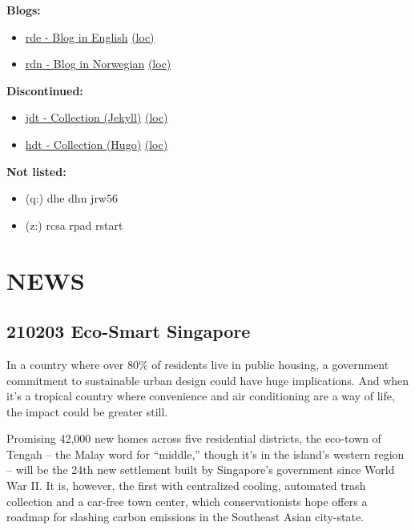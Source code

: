 \documentclass[
]{book}
\providecommand{\tightlist}{%
  \setlength{\itemsep}{0pt}\setlength{\parskip}{0pt}}
\begin{document}
\textbf{Blogs:}

\begin{itemize}
\tightlist
\item
  \href{https://dyrehaugen.github.io/rde}{rde - Blog in English} \href{http://localhost/rde}{(loc)}
\item
  \href{https://dyrehaugen.github.io/rdn}{rdn - Blog in Norwegian} \href{http://localhost/rdn}{(loc)}
\end{itemize}

\textbf{Discontinued:}

\begin{itemize}
\tightlist
\item
  \href{https://dyrehaugen.github.io/jdt}{jdt - Collection (Jekyll)} \href{http://localhost/jdt}{(loc)}
\item
  \href{https://dyrehaugen.github.io/hdt}{hdt - Collection (Hugo)} \href{http://localhost/hdt}{(loc)}
\end{itemize}

\textbf{Not listed:}

\begin{itemize}
\tightlist
\item
  (q:) dhe dhn jrw56
\item
  (z:) rcsa rpad rstart
\end{itemize}

\hypertarget{news}{%
\chapter{NEWS}\label{news}}

\hypertarget{eco-smart-singapore}{%
\section{210203 Eco-Smart Singapore}\label{eco-smart-singapore}}

In a country where over 80\% of residents live in public housing, a government commitment to sustainable urban design could have huge implications. And when it's a tropical country where convenience and air conditioning are a way of life, the impact could be greater still.

Promising 42,000 new homes across five residential districts, the eco-town of Tengah -- the Malay word for ``middle,'' though it's in the island's western region -- will be the 24th new settlement built by Singapore's government since World War II. It is, however, the first with centralized cooling, automated trash collection and a car-free town center, which conservationists hope offers a roadmap for slashing carbon emissions in the Southeast Asian city-state.
\end{document}
